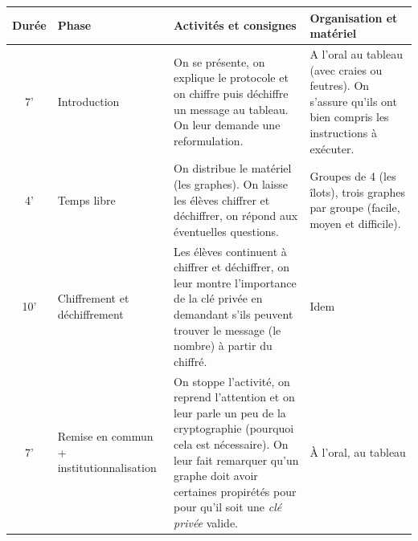 \documentclass[12pt, a4paper]{article}
\begin{document}
	\begin{longtable}{c|m{3.9cm}|m{8.4cm}|m{2.4cm}}		\textbf{Durée} & \textbf{Phase} & \textbf{Activités et consignes} & \textbf{Organisation et matériel} \\ \hline\hline
		
		7' &
		
		Introduction
		
		&
		
		On se présente, on explique le protocole et on chiffre puis déchiffre un message au tableau. On leur demande une reformulation.
		
		& 
		
		A l'oral au tableau (avec craies ou feutres). On s'assure qu'ils ont bien compris les instructions à exécuter.	

		\\ \hline

		4' &

		Temps libre

		&

		On distribue le matériel (les graphes). On laisse les élèves chiffrer et déchiffrer, on répond aux éventuelles questions.

		&

		Groupes de 4 (les îlots), trois graphes par groupe (facile, moyen et difficile).
		
		\\ \hline
		
		10'
		
		&
		
		Chiffrement et déchiffrement	
		
		& 
		
		Les élèves continuent à chiffrer et déchiffrer, on leur montre l'importance de la clé privée en demandant s'ils peuvent trouver le message (le nombre) à partir du chiffré.

		
		& Idem
		
		\\ \hline
		
		7' &
		
		Remise en commun + institutionnalisation
		
		&
		
		On stoppe l'activité, on reprend l'attention et on leur parle un peu de la cryptographie (pourquoi cela est nécessaire). On leur fait remarquer qu'un graphe doit avoir certaines propirétés pour pour qu'il soit une \textit{clé privée} valide.
		
		& 
		
		À l'oral, au tableau
		

\end{longtable}
\end{document}
